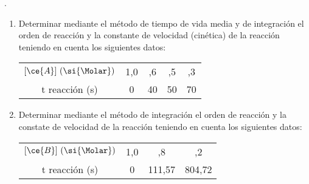 .\begin{enumerate}[label={\alph*)},font={\color{red!50!black}\bfseries}]
	\item Determinar mediante el método de tiempo de vida media y de integración el orden de reacción y la constante de velocidad (cinética) de la reacción  teniendo en cuenta los siguientes datos:
	\begin{center}
		\begin{tabular}{cSSSS}
			\toprule
				$[\ce{A}]~(\si{\Molar})$	&	1,0		&	  ,6	&	  ,5	&	  ,3	\\
				t reacción (\si{\second})	&	0		&	40		&	50		&	70		\\
			\bottomrule
		\end{tabular}
	\end{center}
	\item Determinar mediante el método de integración el orden de reacción y la constate de velocidad de la reacción  teniendo en cuenta los siguientes datos:
	\begin{center}
		\begin{tabular}{cSSS}
			\toprule
				$[\ce{B}]~(\si{\Molar})$	&	1,0		&	   ,8	&	   ,2	\\
				t reacción (\si{\second})	&	0		&	111,57	&	804,72	\\
			\bottomrule
		\end{tabular}
	\end{center}
\end{enumerate}
